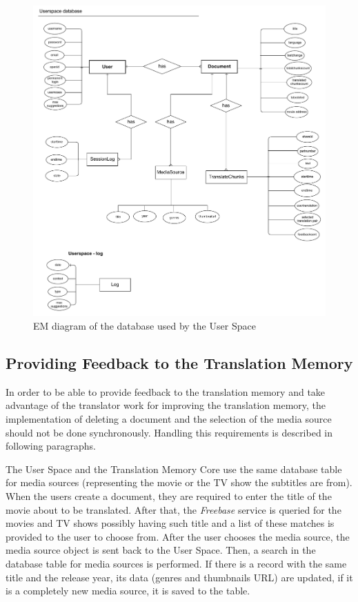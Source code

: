 \begin{figure}
\begin{center}
\includegraphics[scale=0.5]{figures/userspacedb.pdf}
\end{center}
\caption{EM diagram of the database used by the User Space}
\label{fig:em_of_us}
\end{figure}

\subsection{Providing Feedback to the Translation Memory}

In order to be able to provide feedback to the translation memory and take advantage of the translator work for improving the translation memory, the implementation of deleting a document and the selection of the media source should not be done synchronously. Handling this requirements is described in following paragraphs.

The User Space and the Translation Memory Core use the same database table for media sources (representing the movie or the TV show the subtitles are from). When the users create a document, they are required to enter the title of the movie about to be translated. After that, the {\it Freebase} service is queried for the movies and TV shows possibly having such title and a list of these matches is provided to the user to choose from. After the user chooses the media source, the media source object is sent back to the User Space. Then, a search in the database table for media sources is performed. If there is a record with the same title and the release year, its data (genres and thumbnails URL) are updated, if it is a completely new media source, it is saved to the table.

